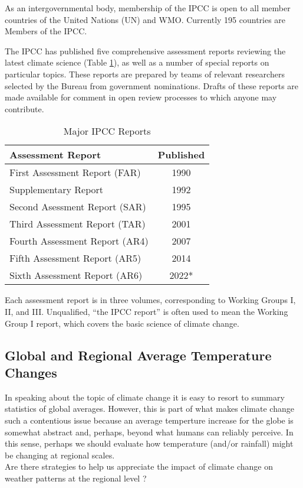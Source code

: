 \documentclass{article}\usepackage[]{graphicx}\usepackage[]{color}
\begin{document}
As an intergovernmental body, membership of the IPCC is open to all member countries of the United Nations (UN) and WMO. Currently 195 countries are Members of the IPCC.

The IPCC has published five comprehensive assessment reports reviewing the latest climate science (Table \ref{tab:IPCC}), as well as a number of special reports on particular topics. These reports are prepared by teams of relevant researchers selected by the Bureau from government nominations. Drafts of these reports are made available for comment in open review processes to which anyone may contribute.

\begin{table}
\caption{Major IPCC Reports}\label{tab:IPCC}
\centering
\begin{tabular}{lc}\hline
Assessment Report             & Published \\ \hline\hline
First Assessment Report (FAR) & 1990    \\
Supplementary Report          & 1992   \\
Second Asessment Report (SAR) & 1995    \\
Third Assessment Report (TAR) & 2001    \\
Fourth Assessment Report (AR4)& 2007   \\
Fifth Assessment Report (AR5) & 2014  \\
Sixth Assessment Report (AR6) & 2022*  \\ \hline
\end{tabular}
\end{table}

Each assessment report is in three volumes, corresponding to Working Groups I, II, and III. Unqualified, ``the IPCC report'' is often used to mean the Working Group I report, which covers the basic science of climate change.

\subsection{Global and Regional Average Temperature Changes}

In speaking about the topic of climate change it is easy to resort to summary statistics of global averages. However, this is part of what makes climate change such a contentious issue because an average temperture increase for the globe is somewhat abstract and, perhaps, beyond what humans can reliably perceive. In this sense, perhaps we should evaluate how temperature (and/or rainfall) might be changing at regional scales. \\ Are there strategies to help us appreciate the impact of climate change on weather patterns at the regional level ? 
\end{document}
